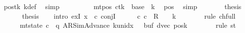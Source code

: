 \begin{isabellebody}
\ pos{}{\isacharunderscore}{\kern0pt}tk\ kdef\ \isamarkupfalse%
\ simp\isanewline
\ \ \ \ \isamarkupfalse%
\ \isamarkupfalse%
\ {\isachardoublequoteopen}{\isasymdots}\ {\isacharequal}{\kern0pt}\ {\isacharparenleft}{\kern0pt}mt{\isacharunderscore}{\kern0pt}pos\ c{\isacharprime}{\kern0pt}{\isacharparenright}{\kern0pt}{\isacharparenleft}{\kern0pt}tk\ {\isacharcolon}{\kern0pt}{\isacharequal}{\kern0pt}\ base\ {\isacharplus}{\kern0pt}\ {\isacharquery}{\kern0pt}k{\isacharparenright}{\kern0pt}{\isachardoublequoteclose}\ \isamarkupfalse%
\ pos{}\ \isamarkupfalse%
\ simp\isanewline
\ \ \ \ \isamarkupfalse%
\ \isamarkupfalse%
\ {\isacharquery}{\kern0pt}thesis\ \isakeywordONE{{\isachardot}{\kern0pt}}\isamarkupfalse%
\isanewline
\ \ \isamarkupfalse%
\isanewline
\ \ \isamarkupfalse%
\ {\isacharquery}{\kern0pt}thesis\isanewline
\ \ \isamarkupfalse%
\ {\isacharparenleft}{\kern0pt}intro\ exI{\isacharbrackleft}{\kern0pt}\ x\ {\isacharequal}{\kern0pt}\ c{}{\isacharbrackright}{\kern0pt}\ conjI{\isacharparenright}{\kern0pt}\isanewline
\ \ \ \ \isamarkupfalse%
\ {\isachardoublequoteopen}{\isacharparenleft}{\kern0pt}c{\isacharprime}{\kern0pt}{\isacharcomma}{\kern0pt}\ c{}{\isacharparenright}{\kern0pt}\ {\isasymin}\ R{\isacharprime}{\kern0pt}\ {\isacharcircum}{\kern0pt}{\isacharcircum}{\kern0pt}\ {\isacharparenleft}{\kern0pt}{}\ {\isacharasterisk}{\kern0pt}\ {\isacharquery}{\kern0pt}k{\isacharparenright}{\kern0pt}{\isachardoublequoteclose}\isanewline
\ \ \ \ \ \ \isamarkupfalse%
\ {\isacharparenleft}{\kern0pt}rule\ ch{\isacharunderscore}{\kern0pt}full{\isacharparenright}{\kern0pt}\isanewline
\ \ \ \ \isamarkupfalse%
\ {\isachardoublequoteopen}mt{\isacharunderscore}{\kern0pt}state\ c{}\ {\isacharequal}{\kern0pt}\ {\isacharparenleft}{\kern0pt}q{\isacharcomma}{\kern0pt}\ AR{\isacharunderscore}{\kern0pt}SimAdvance{\isacharcomma}{\kern0pt}\ k{\isacharunderscore}{\kern0pt}unidx\ {}{\isacharcomma}{\kern0pt}\ {}{\isacharcomma}{\kern0pt}\ buf{\isacharcomma}{\kern0pt}\ dvec{\isacharcomma}{\kern0pt}\ posk{\isacharparenright}{\kern0pt}{\isachardoublequoteclose}\isanewline
\ \ \ \ \ \ \isamarkupfalse%
\ {\isacharparenleft}{\kern0pt}rule\ st{}{\isacharparenright}{\kern0pt}\isanewline
\ \ \ \ \isamarkupfalse%

\end{isabellebody}
